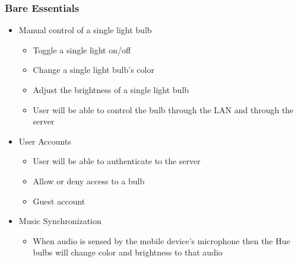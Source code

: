 \documentclass[12pt]{article}
\begin{document}
\subsubsection*{Bare Essentials}
\begin{itemize}
\item Manual control of a single light bulb
\begin{itemize}
\item Toggle a single light on/off
\item Change a single light bulb's color
\item Adjust the brightness of a single light bulb
\item User will be able to control the bulb through the LAN and through the server
\end{itemize}

\item User Accounts
\begin{itemize}
\item User will be able to authenticate to the server
\item Allow or deny access to a bulb
\item Guest account
\end{itemize}

\item Music Synchronization
\begin{itemize}
\item When audio is sensed by the mobile device's microphone then the Hue bulbs will change color and brightness to that audio
\end{itemize}
\end{itemize}
\end{document}
